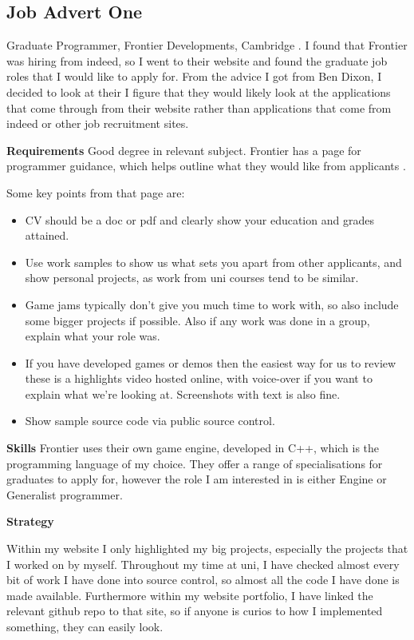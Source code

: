 \documentclass{scrartcl}
\begin{document}
\subsection{Job Advert One}
Graduate Programmer, Frontier Developments, Cambridge  \cite{JobOne}. 
I found that Frontier was hiring from indeed, so I went to their website and found the graduate job roles that I would like to apply for.
From the advice I got from Ben Dixon, I decided to look at their
I figure that they would likely look at the applications that come through from their website rather than applications that come from indeed or other job recruitment sites.



\textbf{Requirements}
Good degree in relevant subject.
 Frontier has a page for programmer guidance, which helps outline what they would like from applicants \cite{FrontierAdvice}.

Some key points from that page are:
\begin{itemize}
	\item CV should be a doc or pdf and clearly show your education and grades attained.
	\item Use work samples to show us what sets you apart from other applicants, and show personal projects, as work from uni courses tend to be similar.
	\item Game jams typically don't give you much time to work with, so also include some bigger projects if possible. Also if any work was done in a group, explain what your role was.
	\item If you have developed games or demos then the easiest way for us to review these is a highlights video hosted online, with voice-over if you want to explain what we're looking at. Screenshots with text is also fine.
	\item Show sample source code via public source control.
\end{itemize}


\textbf{Skills}
Frontier uses their own game engine, developed in C++, which is the programming language of my choice.
They offer a range of specialisations for graduates to apply for, however the role I am interested in is either Engine or Generalist programmer.


\textbf{Strategy} %

Within my website I only highlighted my big projects, especially the projects that I worked on by myself.
Throughout my time at uni, I have checked almost every bit of work I have done into source control, so almost all the code I have done is made available. Furthermore within my website portfolio, I have linked the relevant github repo to that site, so if anyone is curios to how I implemented something, they can easily look.
\end{document}
